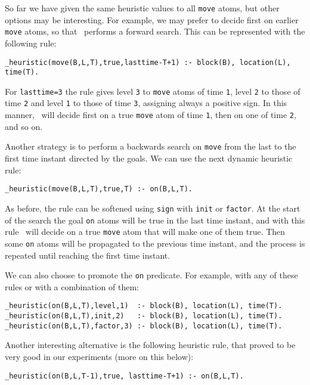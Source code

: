 So far we have given the same heuristic values to all \texttt{move} atoms,
but other options may be interesting. For example, we may prefer to decide first on earlier \texttt{move} atoms,
so that \clasp\ performs a forward search. This can be represented with the following rule:
\begin{lstlisting}[numbers=none]
_heuristic(move(B,L,T),true,lasttime-T+1) :- block(B), location(L), time(T).\end{lstlisting}

For \texttt{lasttime=3} the rule gives level \texttt{3} to \texttt{move} atoms of time \texttt{1},
level \texttt{2} to those of time \texttt{2} and level \texttt{1} to those of time \texttt{3},
assigning always a positive sign.  In this manner, \clasp\ will decide first on a true \texttt{move}
atom of time \texttt{1}, then on one of time \texttt{2},  and so on.

Another strategy is to perform a backwards search on \texttt{move} from the last to the
first time instant directed by the goals. We can use the next dynamic heuristic rule:
\begin{lstlisting}[numbers=none]
_heuristic(move(B,L,T),true,T) :- on(B,L,T).\end{lstlisting}

As before, the rule can be softened using \texttt{sign} with \texttt{init} or \texttt{factor}.
At the start of the search the goal \texttt{on} atoms will be true in the last time instant,
and with this rule \clasp\ will decide on a true \texttt{move} atom that will make one of them true.
Then some \texttt{on} atoms will be propagated to the previous time instant,
and the process is repeated until reaching the first time instant.

 We can also choose to promote the \texttt{on} predicate.  For example, with any of these rules or with a combination of them:
\begin{lstlisting}[numbers=none]
_heuristic(on(B,L,T),level,1)  :- block(B), location(L), time(T).
_heuristic(on(B,L,T),init,2)   :- block(B), location(L), time(T).
_heuristic(on(B,L,T),factor,3) :- block(B), location(L), time(T).\end{lstlisting}

 Another interesting alternative is the following heuristic rule,  that proved to be very good in our experiments (more on this below):
\begin{lstlisting}[numbers=none]
_heuristic(on(B,L,T-1),true, lasttime-T+1) :- on(B,L,T).\end{lstlisting}


